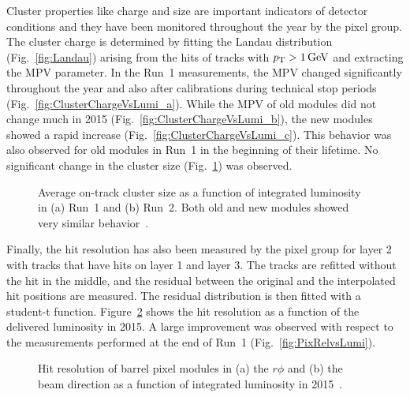 Cluster properties like charge and size are important indicators of detector conditions and they have been monitored throughout the year by the pixel group.
The cluster charge is determined by fitting the Landau distribution (Fig.~\ref{fig:Landau}) arising from the hits of tracks with $p_{\mathrm{T}} > 1\,\text{Ge\hspace{-.08em}V}$ and extracting the MPV parameter.
In the Run~1 measurements, the MPV changed significantly throughout the year and also after calibrations during technical stop periods (Fig.~\ref{fig:ClusterChargeVsLumi_a}).
While the MPV of old modules did not change much in 2015 (Fig.~\ref{fig:ClusterChargeVsLumi_b}), the new modules showed a rapid increase (Fig.~\ref{fig:ClusterChargeVsLumi_c}).
This behavior was also observed for old modules in Run~1 in the beginning of their lifetime. No significant change in the cluster size (Fig.~\ref{fig:ClusterSizeVsLumi}) was observed.

\begin{figure}[!htb]
 \begin{center}
 \end{center}
 \caption{Average on-track cluster size as a function of integrated luminosity in (a) Run~1 and (b) Run~2. Both old and new modules showed very similar behavior~\cite{PixelOffline}.}
 \label{fig:ClusterSizeVsLumi}
\end{figure}

Finally, the hit resolution has also been measured by the pixel group for layer 2 with tracks that have hits on layer 1 and layer 3.
The tracks are refitted without the hit in the middle, and the residual between the original and the interpolated hit positions are measured.
The residual distribution is then fitted with a student-t function. Figure~\ref{fig:RelVsLumi2015} shows the hit resolution as a function of the delivered luminosity in 2015.
A large improvement was observed with respect to the measurements performed at the end of Run~1 (Fig.~\ref{fig:PixRelvsLumi}).

\begin{figure}[!htb]
 \begin{center}
 \end{center}
 \caption{Hit resolution of barrel pixel modules in (a) the $r\phi$ and (b) the beam direction as a function of integrated luminosity in 2015~\cite{PixelOffline}.}
 \label{fig:RelVsLumi2015}
\end{figure}
